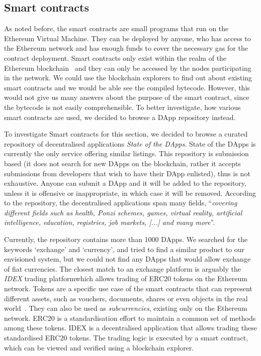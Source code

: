 \subsection{Smart contracts}

As noted before, the smart contracts are small programs that run on the Ethereum Virtual Machine. They can be deployed by anyone, who has access to the Ethereum network and has enough funds to cover the necessary gas for the contract deployment. Smart contracts only exist within the realm of the Ethereum blockchain~\cite{JohnWeldon2016BuildingContract} and they can only be accessed by the nodes participating in the network. We could use the blockchain explorers to find out about existing smart contracts and we would be able see the compiled bytecode. However, this would not give us many answers about the purpose of the smart contract, since the bytecode is not easily comprehensible. To better investigate, how various smart contracts are used, we decided to browse a DApp repository instead.

To investigate Smart contracts for this section, we decided to browse a curated repository of decentralised applications \textit{State of the DApps}\footnotemark.%
% 
% 
State of the DApps is currently the only service offering similar listings. This repository is submission based (it does not search for new DApps on the blockchain, rather it accepts submissions from developers that wish to have their DApp enlisted), thus is not exhaustive. Anyone can submit a DApp and it will be added to the repository, unless it is offensive or inappropriate, in which case it will be removed. According to the repository, the decentralised applications span many fields, ``\textit{covering different fields such as health, Ponzi schemes, games, virtual reality, artificial intelligence, education, registries, job markets, [...] and many more}''\footnotemark. 
% 

Currently, the repository contains more than 1000 DApps. We searched for the keywords `exchange' and `currency', and tried to find a similar product to our envisioned system, but we could not find any DApps that would allow exchange of fiat currencies. The closest match to an exchange platform is arguably the \textit{IDEX} trading platform\footnotemark which allows trading of ERC20 tokens on the Ethereum network. Tokens are a specific use case of the smart contracts that can represent different assets, such as vouchers, documents, shares or even objects in the real world~\cite{NathanReiff2017WhatEthereum}. They can also be used as \textit{subcurrencies}, existing only on the Ethereum network. ERC20 is a standardisation effort to maintain a common set of methods among these tokens.%
% 
%
IDEX is a decentralised application that allows trading these standardised ERC20 tokens. The trading logic is executed by a smart contract, which can be viewed and verified using a blockchain explorer\footnotemark.
% 

